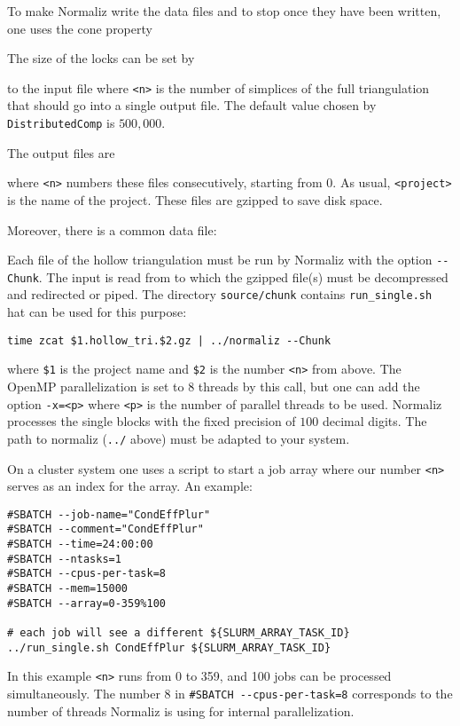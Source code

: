 To make Normaliz write the data files and to stop once they have been written, one uses the cone property
\begin{itemize}
\end{itemize}
The size of the locks can be set by
\begin{itemize}
\end{itemize}
to the input file where \verb|<n>| is the number of simplices of the full triangulation that should go into a single output file.  The default value chosen by \verb|DistributedComp| is $500,000$.

The output files are
\begin{itemize}
\end{itemize}
where \verb|<n>| numbers these files consecutively, starting from $0$. As usual, \verb|<project>| is the name of the project. These files are gzipped to save disk space.

Moreover, there is a common data file:
\begin{itemize}
\end{itemize}

Each file of the hollow triangulation must be run by  Normaliz with the option \verb|--Chunk|. The input is read from  to which the gzipped file(s) must be decompressed and redirected or piped. The directory \verb|source/chunk| contains \verb|run_single.sh| hat can be used for this purpose:
\begin{Verbatim}
time zcat $1.hollow_tri.$2.gz | ../normaliz --Chunk 
\end{Verbatim}
where \verb|$1| is the project name and \verb|$2| is the number \verb|<n>| from above. The OpenMP parallelization is set to $8$ threads by this call, but one can add the option \verb|-x=<p>| where \verb|<p>| is the number of parallel threads to be used. Normaliz processes the single blocks with the fixed precision of $100$ decimal digits. The path to normaliz (\verb|../| above) must be adapted to your system.

On a cluster system one uses a script to start a job array where our number \verb|<n>| serves as an index for the array. An example:
\begin{Verbatim}
#SBATCH --job-name="CondEffPlur"
#SBATCH --comment="CondEffPlur"
#SBATCH --time=24:00:00
#SBATCH --ntasks=1
#SBATCH --cpus-per-task=8
#SBATCH --mem=15000
#SBATCH --array=0-359%100

# each job will see a different ${SLURM_ARRAY_TASK_ID}
../run_single.sh CondEffPlur ${SLURM_ARRAY_TASK_ID}
\end{Verbatim}
In this example \verb|<n>| runs from 0 to 359, and 100 jobs can be processed simultaneously. The number $8$ in \verb|#SBATCH --cpus-per-task=8| corresponds to the number of threads Normaliz is using for internal parallelization. 


